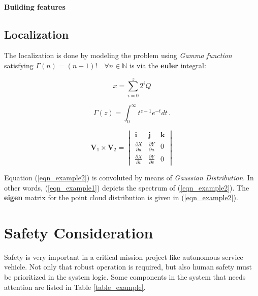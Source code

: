 \documentclass[10 pt,letterpaper,conference]{IEEEtran}
\begin{document}
\paragraph{Building features}\label{building-features}

\subsection{Localization}\label{localization}

The localization is done by modeling the problem using \emph{Gamma
function} satisfying \(\Gamma(n) = (n-1)!\quad\forall n\in\mathbb N\) is
via the \textbf{euler} integral:

\begin{equation}
\label{eqn_example1}
x = \sum\limits_{i=0}^{z} 2^{i}Q
\end{equation}

\begin{equation}
\label{eqn_example2}
\Gamma(z) = \int_0^\infty t^{z-1}e^{-t}dt\,.
\end{equation}

\begin{equation}
\label{eqn_example3}
\mathbf{V}_1 \times \mathbf{V}_2 =  \begin{vmatrix}
\mathbf{i} & \mathbf{j} & \mathbf{k} \\
\frac{\partial X}{\partial u} &  \frac{\partial Y}{\partial u} & 0 \\
\frac{\partial X}{\partial v} & \frac{\partial Y}{\partial v} & 0
\end{vmatrix}
\end{equation}

Equation (\ref{eqn_example2}) is convoluted by means of \emph{Gaussian
Distribution}. In other words, (\ref{eqn_example1}) depicts the spectrum
of (\ref{eqn_example2}). The \textbf{eigen }matrix for the point cloud
distribution is given in (\ref{eqn_example2}).

\section{Safety Consideration}\label{safety-consideration}

Safety is very important in a critical mission project like autonomous
service vehicle. Not only that robust operation is required, but also
human safety must be prioritized in the system logic. Some components in
the system that needs attention are listed in Table \ref{table_example}.
\end{document}
